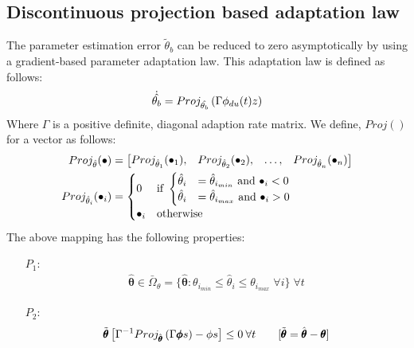 \subsection{Discontinuous projection based adaptation law}
The parameter estimation error $\tilde \theta_b$ can be reduced to zero asymptotically by using a gradient-based parameter adaptation law. This adaptation law is defined as follows:
\begin{align}
    \dot{\hat{\theta_b}} &= Proj_{\hat{\theta_b}}\left( \Gamma \phi_{du}(t) z \right) \\
\end{align}
Where $\Gamma$ is a positive definite, diagonal adaption rate matrix.
We define,  $Proj()$ for a vector as follows:
\begin{align}
    Proj_{\hat{\theta}} (\bullet) &= \begin{bmatrix} Proj_{\hat \theta_1}(\bullet_1), &
                                        Proj_{\hat \theta_2}(\bullet_2), &
                                        \hdots, &
                                        Proj_{\hat \theta_n}(\bullet_n) \end{bmatrix}\\
    Proj_{\hat \theta_i}(\bullet_i)
    &= \begin{cases}
        0 & \text{if } \begin{cases}
                        \hat \theta_i &= \hat \theta_{i_{min}} \text{  and  } \bullet_i < 0\\
                        \hat \theta_i &= \hat \theta_{i_{max}} \text{  and  } \bullet_i > 0\\
                       \end{cases}\\
        \bullet_i & \text{otherwise}
    \end{cases}
\end{align}
The above mapping has the following properties:
\begin{itemize}
    \item[$P_1$:]
    \begin{align}
        \hat{\pmb \theta} \in \bar \Omega_{\theta}=\{\hat{\pmb \theta} :
        \theta_{i_{min}} \leq \hat \theta_i \leq \theta_{i_{max}} \; \forall
        i\} \; \forall t
    \end{align}

    \item[$P_2$:]
    \begin{align}
        \tilde{\pmb{\theta}} \left[ \Gamma^{-1} Proj_{\hat{\pmb\theta}}
        \left( \Gamma \pmb \phi s \right) - \phi s \right] \leq 0 \: \forall t \qquad
        [\tilde{\pmb{\theta}} = \hat{\pmb\theta} - \pmb \theta]
    \end{align}
\end{itemize}

